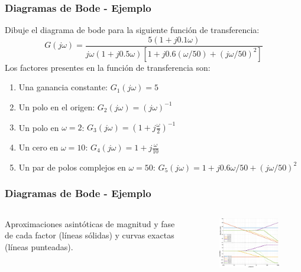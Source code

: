 \documentclass[aspectratio=169]{beamer}
\theoremstyle{definition}
\theoremstyle{plain}
\theoremstyle{remark}
\begin{document}
\begin{frame}[<+->]\frametitle{Diagramas de Bode - Ejemplo}
	Dibuje el diagrama de bode para la siguiente función de transferencia:
	\begin{equation*}
		G(j\omega) = \frac{5(1+j0.1\omega)}{j\omega(1+j0.5\omega)[1+j0.6(\omega/50)+(j\omega/50)^2]}
	\end{equation*}
	\pause
	Los factores presentes en la función de transferencia son:
	\begin{enumerate}
		\item Una ganancia constante: $G_1(j\omega) = 5$
		\item Un polo en el origen: $G_2(j\omega) = (j\omega)^{-1}$
		\item Un polo en $\omega = 2$: $G_3(j\omega) = \left(1+j\frac{\omega}{2}\right)^{-1}$
		\item Un cero en $\omega = 10$: $G_4(j\omega) = 1+j\frac{\omega}{10}$
		\item Un par de polos complejos en $\omega = 50$: $G_5(j\omega) = 1+j0.6\omega/50+(j\omega/50)^2$
	\end{enumerate}
\end{frame}

\begin{frame}[<+->]\frametitle{Diagramas de Bode - Ejemplo}
	\vspace*{-2mm}
	\begin{columns}
		\begin{column}{0.3\textwidth}
			Aproximaciones asintóticas de magnitud y fase de cada factor (líneas sólidas) y curvas exactas (líneas punteadas).
		\end{column}
		\begin{column}{0.7\textwidth}
	\begin{figure}
		\centering
		\includegraphics[width=9cm]{images/bodeExample1a.eps}
	\end{figure}
		\end{column}
	\end{columns}
\end{frame}
\end{document}
